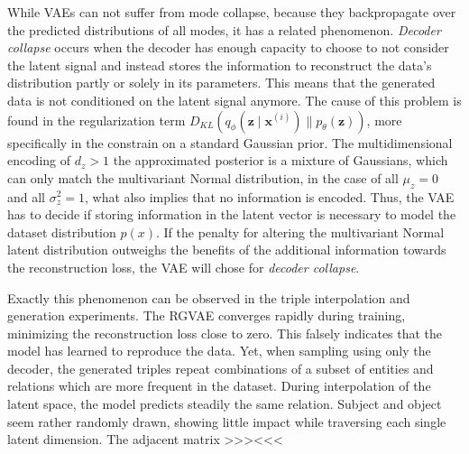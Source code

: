 While VAEs can not suffer from mode collapse, because they backpropagate over the predicted distributions of all modes, it has a related phenomenon. \textit{Decoder collapse} occurs when the decoder has enough capacity to choose to not consider the latent signal and instead stores the information to reconstruct the data's distribution partly or solely in its parameters. This means that the generated data is not conditioned on the latent signal anymore. The cause of this problem is found in the regularization term $D_{K L}\left(q_{{\phi}}\left(\mathbf{z} \mid \mathbf{x}^{(i)}\right) \| p_{{\theta}}(\mathbf{z})\right)$, more specifically in the constrain on a standard Gaussian prior. The multidimensional encoding of $d_z>1$ the approximated posterior is a mixture of Gaussians, which can only match the multivariant Normal distribution, in the case of all $\mu_z=0$ and all $\sigma^2_z=1$, what also implies that no information is encoded. Thus, the VAE has to decide if storing information in the latent vector is necessary to model the dataset distribution $p(x)$. If the penalty for altering the multivariant Normal latent distribution outweighs the benefits of the additional information towards the reconstruction loss, the VAE will chose for \textit{decoder collapse}. 




Exactly this phenomenon can be observed in the triple interpolation and generation experiments. The RGVAE converges rapidly during training, minimizing the reconstruction loss close to zero. This falsely indicates that the model has learned to reproduce the data. Yet, when sampling using only the decoder, the generated triples repeat combinations of a subset of entities and relations which are more frequent in the dataset. During interpolation of the latent space, the model predicts steadily the same relation. Subject and object seem rather randomly drawn, showing little impact while traversing each single latent dimension. The adjacent matrix >>><<<

